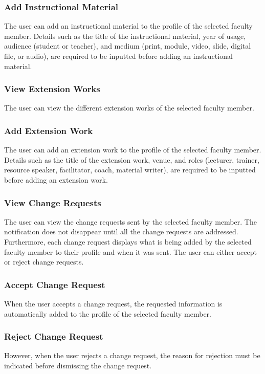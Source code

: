     	\subsubsection{Add Instructional Material}
    	The user can add an instructional material to the profile of the selected faculty member. Details such as the title of the instructional material, year of usage, audience (student or teacher), and medium (print, module, video, slide, digital file, or audio), are required to be inputted before adding an instructional material.
    	
    	\subsubsection{View Extension Works}
    	The user can view the different extension works of the selected faculty member.
    	
    	\subsubsection{Add Extension Work}
    	The user can add an extension work to the profile of the selected faculty member. Details such as the title of the extension work, venue, and roles (lecturer, trainer, resource speaker, facilitator, coach, material writer), are required to be inputted before adding an extension work.
    	
    	\subsubsection{View Change Requests}
    	The user can view the change requests sent by the selected faculty member. The notification does not disappear until all the change requests are addressed. Furthermore, each change request displays what is being added by the selected faculty member to their profile and when it was sent. The user can either accept or reject change requests.
    	
    	\subsubsection{Accept Change Request}
    	When the user accepts a change request, the requested information is automatically added to the profile of the selected faculty member.
    	
    	\subsubsection{Reject Change Request}
    	However, when the user rejects a change request, the reason for rejection must be indicated before dismissing the change request.
        

